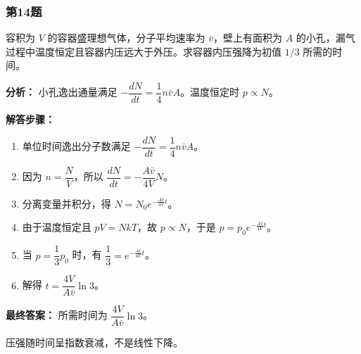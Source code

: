 \documentclass[12pt,a4paper]{ctexart}
\begin{document}
\subsubsection*{第14题}
\begin{tcolorbox}[colback=gray!2!white,colframe=black!60,title={题目}]
容积为 \(V\) 的容器盛理想气体，分子平均速率为 \(\bar v\)，壁上有面积为 \(A\) 的小孔，漏气过程中温度恒定且容器内压远大于外压。求容器内压强降为初值 \(1/3\) 所需的时间。\par
\end{tcolorbox}
\begin{tcolorbox}[colback=blue!2!white,colframe=blue!55!black,title={完整答案}]
\textbf{分析：}
小孔逸出通量满足 \(-\dfrac{dN}{dt}=\dfrac14 n\bar vA\)。温度恒定时 \(p\propto N\)。\par
\textbf{解答步骤：}
\begin{enumerate}
\item 单位时间逸出分子数满足 \(-\dfrac{dN}{dt}=\dfrac14 n\bar vA\)。
\item 因为 \(n=\dfrac{N}{V}\)，所以 \(\dfrac{dN}{dt}=-\dfrac{A\bar v}{4V}N\)。
\item 分离变量并积分，得 \(N=N_0e^{-\frac{A\bar v}{4V}t}\)。
\item 由于温度恒定且 \(pV=NkT\)，故 \(p\propto N\)，于是 \(p=p_0e^{-\frac{A\bar v}{4V}t}\)。
\item 当 \(p=\dfrac13 p_0\) 时，有 \(\dfrac13=e^{-\frac{A\bar v}{4V}t}\)。
\item 解得 \(t=\dfrac{4V}{A\bar v}\ln 3\)。
\end{enumerate}
\textbf{最终答案：}
所需时间为 \(\dfrac{4V}{A\bar v}\ln 3\)。\par
\end{tcolorbox}
\begin{tcolorbox}[colback=red!2!white,colframe=red!55!black,title={易错点}]
压强随时间呈指数衰减，不是线性下降。\par
\end{tcolorbox}
\end{document}
